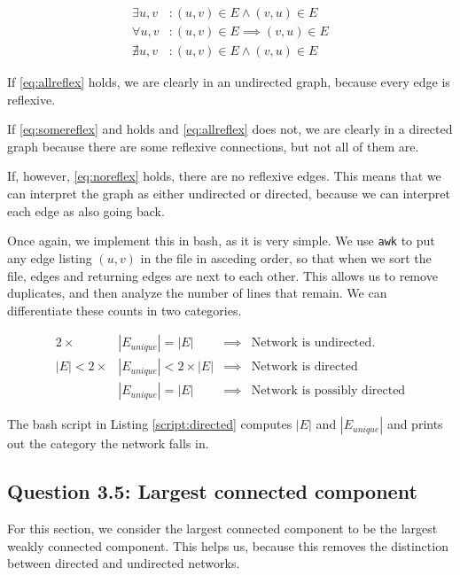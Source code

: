 \documentclass[12pt,a4paper,hidelinks]{article}
\begin{document}
\begin{align}
\label{eq:somereflex} \exists u, v &: (u, v) \in E \land (v, u) \in E \\
\label{eq:allreflex} \forall u, v &: (u, v) \in E \implies (v, u) \in E \\
\label{eq:noreflex}\nexists u, v &: (u, v) \in E \land (v, u) \in E
\end{align}

If \ref{eq:allreflex} holds, we are clearly in an undirected graph, because every edge is reflexive.

If \ref{eq:somereflex} and holds and \ref{eq:allreflex} does not, we are clearly in a directed graph because there are some reflexive connections, but not all of them are.

If, however, \ref{eq:noreflex} holds, there are no reflexive edges. This means that we can interpret the graph as either undirected or directed, because we can interpret each edge as also going back.

Once again, we implement this in bash, as it is very simple. We use \texttt{awk} to put any edge listing $(u, v)$ in the file in asceding order, so that when we sort the file, edges and returning edges are next to each other. This allows us to remove duplicates, and then analyze the number of lines that remain. We can differentiate these counts in two categories.

\begin{align*}
2 \times & |E_{unique}| = |E| & \implies & \text{Network is undirected.} \\
|E| < 2 \times & |E_{unique}| < 2 \times |E| & \implies & \text{Network is directed} \\
& |E_{unique}| = |E| & \implies & \text{Network is possibly directed}
\end{align*}

The bash script in Listing \ref{script:directed} computes $|E|$ and $|E_{unique}|$ and prints out the category the network falls in.



\subsection*{Question 3.5: Largest connected component}

For this section, we consider the largest connected component to be the largest weakly connected component. This helps us, because this removes the distinction between directed and undirected networks.
\end{document}
